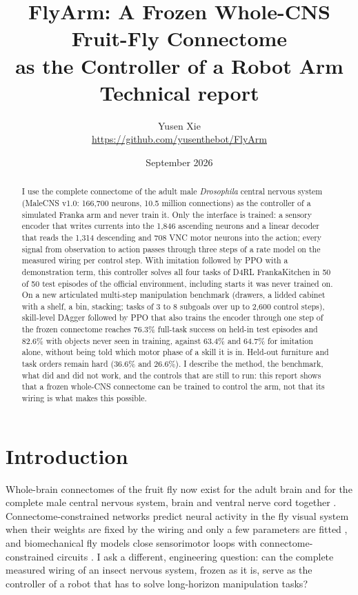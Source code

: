 \documentclass[10pt,twocolumn]{article}
\title{\textbf{FlyArm: A Frozen Whole-CNS Fruit-Fly Connectome\\as the Controller of a Robot Arm}\\[4pt]
\large Technical report}
\author{Yusen Xie\\\small\url{https://github.com/yusenthebot/FlyArm}}
\date{September 2026}
\begin{document}
\maketitle

\begin{abstract}
I use the complete connectome of the adult male \emph{Drosophila} central nervous system (MaleCNS v1.0: 166,700 neurons, 10.5 million connections) as the controller of a simulated Franka arm and never train it.
Only the interface is trained: a sensory encoder that writes currents into the 1,846 ascending neurons and a linear decoder that reads the 1,314 descending and 708 VNC motor neurons into the action; every signal from observation to action passes through three steps of a rate model on the measured wiring per control step.
With imitation followed by PPO with a demonstration term, this controller solves all four tasks of D4RL FrankaKitchen in 50 of 50 test episodes of the official environment, including starts it was never trained on.
On a new articulated multi-step manipulation benchmark (drawers, a lidded cabinet with a shelf, a bin, stacking; tasks of 3 to 8 subgoals over up to 2,600 control steps), skill-level DAgger followed by PPO that also trains the encoder through one step of the frozen connectome reaches 76.3\% full-task success on held-in test episodes and 82.6\% with objects never seen in training, against 63.4\% and 64.7\% for imitation alone, without being told which motor phase of a skill it is in.
Held-out furniture and task orders remain hard (36.6\% and 26.6\%).
I describe the method, the benchmark, what did and did not work, and the controls that are still to run: this report shows that a frozen whole-CNS connectome can be trained to control the arm, not that its wiring is what makes this possible.
\end{abstract}

\section{Introduction}

Whole-brain connectomes of the fruit fly now exist for the adult brain \citep{dorkenwald2024flywire} and for the complete male central nervous system, brain and ventral nerve cord together \citep{berg2026malecns}.
Connectome-constrained networks predict neural activity in the fly visual system when their weights are fixed by the wiring and only a few parameters are fitted \citep{lappalainen2024connectome}, and biomechanical fly models close sensorimotor loops with connectome-constrained circuits \citep{wangchen2024neuromechfly}.
I ask a different, engineering question: can the complete measured wiring of an insect nervous system, frozen as it is, serve as the controller of a robot that has to solve long-horizon manipulation tasks?
\end{document}
